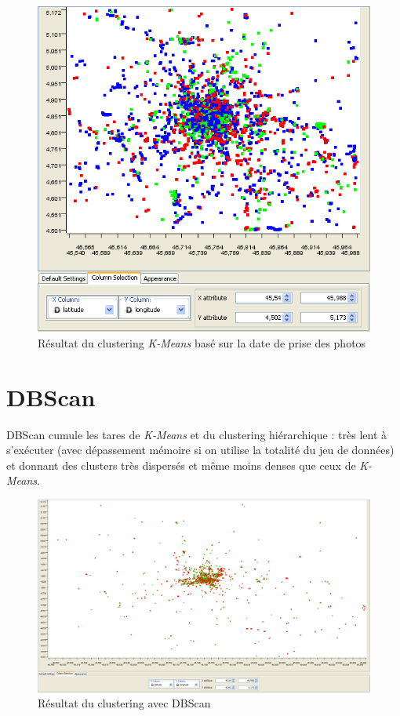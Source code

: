     \begin{figure}[H]
        \centering
        \includegraphics[scale=0.28]{../screenshots/kmeans_month.png}
        \caption{Résultat du clustering \textit{K-Means} basé sur la date de prise des photos}
        \label{diagram:kmeans_month}
    \end{figure}


\section{DBScan}
    DBScan cumule les tares de \textit{K-Means} et du clustering hiérarchique : très lent à s’exécuter (avec dépassement mémoire
    si on utilise la totalité du jeu de données) et donnant des clusters très dispersés et même moins denses que ceux de \textit{K-Means}.


    \begin{figure}[H]
        \centering
        \includegraphics[scale=0.3]{../screenshots/dbscan_geographic.png}
        \caption{Résultat du clustering avec DBScan}
        \label{diagram:dbscan_geographic}
    \end{figure}


